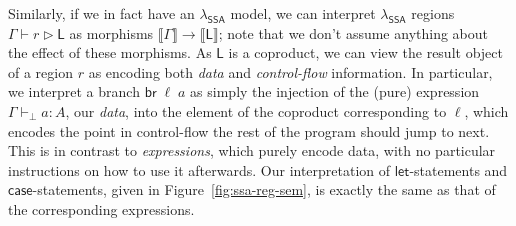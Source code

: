 \documentclass[acmsmall,screen,review]{acmart}
\newcommand{\ms}[1]{\ensuremath{\mathsf{#1}}}
\newcommand{\brb}[2]{\ms{br}\;#1\;#2}
\newcommand{\hasty}[4]{#1 \vdash_{#2} #3: {#4}}
\newcommand{\haslb}[3]{#1 \vdash #2 \rhd #3}
\newcommand{\dnt}[1]{\llbracket{#1}\rrbracket}
\newcommand{\isotopessa}{\(\lambda_{\ms{SSA}}\)}
\begin{document}
Similarly, if we in fact have an \isotopessa{} model, we can interpret \isotopessa{} regions
$\haslb{\Gamma}{r}{\ms{L}}$ as morphisms $\dnt{\Gamma} \to \dnt{\ms{L}}$; note that we don't assume
anything about the effect of these morphisms. As $\ms{L}$ is a coproduct, we can view the result
object of a region $r$ as encoding both \emph{data} and \emph{control-flow} information. In
particular, we interpret a branch $\brb{\ell}{a}$ as simply the injection of the (pure) expression
$\hasty{\Gamma}{\bot}{a}{A}$, our \emph{data}, into the element of the coproduct corresponding to
$\ell$, which encodes the point in control-flow the rest of the program should jump to next. This is
in contrast to \emph{expressions}, which purely encode data, with no particular instructions on how
to use it afterwards. Our interpretation of \ms{let}-statements and \ms{case}-statements, given in
Figure~\ref{fig:ssa-reg-sem}, is exactly the same as that of the corresponding expressions.
\end{document}
